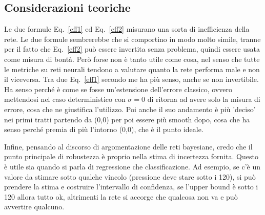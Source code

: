 \documentclass[
	letterpaper,
	a4paper,
	cleardoublepage=empty,
	headings=twolinechapter,
	numbers=autoenddot,
]{article}
\newcommand{\Eq}[0]{Eq.}
\begin{document}
	\subsection{Considerazioni teoriche}
	Le due formule \Eq~\ref{eff1} ed \Eq~\ref{eff2} misurano una sorta di inefficienza della rete. Le due formule sembrerebbe che si comportino in modo molto simile, tranne per il fatto che \Eq~\ref{eff2} può essere invertita senza problema, quindi essere usata come misura di bontà. Però forse non è tanto utile come cosa, nel senso che tutte le metriche su reti neurali tendono a valutare quanto la rete performa male e non il viceversa. Tra due \Eq~\ref{eff1} secondo me ha più senso, anche se non invertibile. Ha senso perché è come se fosse un'estensione dell'errore classico, ovvero mettendosi nel caso deterministico con $\sigma=0$ di ritorna ad avere solo la misura di errore, cosa che ne giustifica l'utilizzo. Poi anche il suo andamento è più 'deciso' nei primi tratti partendo da (0,0) per poi essere più smooth dopo, cosa che ha senso perché premia di più l'intorno (0,0), che è il punto ideale.
	
	Infine, pensando al discorso di argomentazione delle reti bayesiane, credo che il punto principale di robustezza è proprio nella stima di incertezza fornita. Questo è utile sia quando si parla di regressione che classificazione. Ad esempio, se c'è un valore da stimare sotto qualche vincolo (pressione deve stare sotto i 120), si può prendere la stima e costruire l'intervallo di confidenza, se l'upper bound è sotto i 120 allora tutto ok, altrimenti la rete si accorge che qualcosa non va e può avvertire qualcuno.
	
	\clearpage
	
	
	
	
	
	
\end{document}
